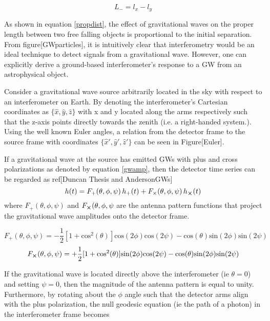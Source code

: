 	\begin{equation}
	L_{-} = l_{x} - l_{y}
	\end{equation}
	
	As shown in equation \ref{propdist}, the effect of gravitational waves on the proper length between two free falling objects is proportional to the initial separation.  From figure[GWparticles], it is intuitively clear that interferometry would be an ideal technique to detect signals from a gravitational wave.  However, one can explicitly derive a ground-based interferometer's response to a GW from an astrophysical object.
	
	Consider a gravitational wave source arbitrarily located in the sky with respect to an interferometer on Earth. By denoting the interferometer's Cartesian coordinates as $\{\hat{x},\hat{y},\hat{z}\}$ with x and y located along the arms respectively such that the z-axis points directly towards the zenith (i.e. a right-handed system.).  Using the well known Euler angles, a relation from the detector frame to the source frame with coordinates $\{\hat{x}',\hat{y}',\hat{z}'\}$ can be seen in Figure[Euler]. 
	
	If a gravitational wave at the source has emitted GWs with plus and cross polarizations as denoted by equation \ref{gwamp}, then the detector time series can be regarded as ref[Duncan Thesis and AndersonGWs]
	\begin{equation}
	h(t) = F_{+}(\theta,\phi,\psi) \, h_{+}(t) + F_{\times}(\theta,\phi,\psi) \, h_{\cross}(t)
	\end{equation}
	where $F_{+}(\theta,\phi,\psi)$ and $F_{\cross}(\theta,\phi,\psi$ are the antenna pattern functions that project the gravitational wave amplitudes onto the detector frame.
	
	\begin{equation}\label{Fplus}
	F_{+}(\theta,\phi,\psi) = -\frac{1}{2}[1+\text{cos}^2(\theta)] \text{cos}(2\phi) \text{cos}(2\psi) - \text{cos}(\theta) \text{sin}(2\phi) \text{sin}(2\psi)
	\end{equation}
	\begin{equation}\label{Fcross}
	F_{\cross}(\theta,\phi,\psi) = + \frac{1}{2}[1+\text{cos}^2(\theta)] \text{sin}(2\phi) \text{cos}(2\psi) - \text{cos}(\theta) \text{sin}(2\phi) \text{sin}(2\psi)
	\end{equation}
	
	If the gravitational wave is located directly above the interferometer (ie $\theta = 0$) and setting $\psi=0$, then the magnitude of the antenna pattern is equal to unity.  Furthermore, by rotating about the $\phi$ angle such that the detector arms align with the plus polarization, the null geodesic equation (ie the path of a photon) in the interferometer frame becomes 
	
